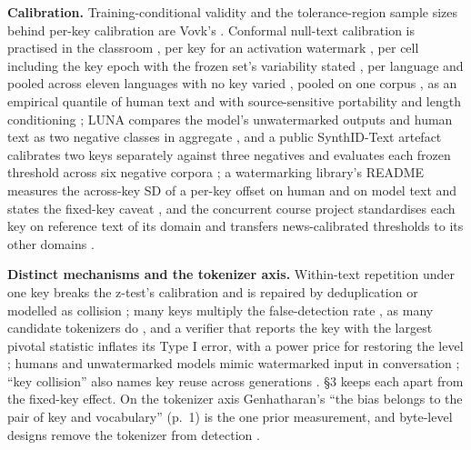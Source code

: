 \documentclass[11pt,letterpaper]{article}
\begin{document}
\textbf{Calibration.} Training-conditional validity and the tolerance-region sample sizes behind per-key calibration are Vovk's \citep[Propositions 2a and 2b]{vovk2012conditional}. Conformal null-text calibration is practised in the classroom \citep{xie2025classroom}, per key for an activation watermark \citep{aremu2026activation}, per cell including the key epoch with the frozen set's variability stated \citep{delbianco2026compliance}, per language and pooled across eleven languages with no key varied \citep{nemecek2026crosslingual}, pooled on one corpus \citep{lichen2026chainmark}, as an empirical quantile of human text \citep{dathathri2024synthid} and with source-sensitive portability and length conditioning \citep{lihe2026saccopula, globalsketch2026}; LUNA compares the model's unwatermarked outputs and human text as two negative classes in aggregate \citep{park2026luna}, and a public SynthID-Text artefact calibrates two keys separately against three negatives and evaluates each frozen threshold across six negative corpora \citep{xlr8harder2026synthid}; a watermarking library's README measures the across-key SD of a per-key offset on human and on model text and states the fixed-key caveat \citep{bonet2026llmwatermark}, and the concurrent course project standardises each key on reference text of its domain and transfers news-calibrated thresholds to its other domains \citep{yukhimchuk2026keylottery}.

\textbf{Distinct mechanisms and the tokenizer axis.} Within-text repetition under one key breaks the z-test's calibration and is repaired by deduplication or modelled as collision \citep{fernandez2023bricks, kirchenbauer2024reliability, cai2025collision}; many keys multiply the false-detection rate \citep{fu2025multiuse}, as many candidate tokenizers do \citep{wang2026bytemark}, and a verifier that reports the key with the largest pivotal statistic inflates its Type I error, with a power price for restoring the level \citep{zhou2026blade}; humans and unwatermarked models mimic watermarked input in conversation \citep{khachaturov2025repetition}; ``key collision'' also names key reuse across generations \citep{wu2024collision}. \S{}3 keeps each apart from the fixed-key effect. On the tokenizer axis Genhatharan's ``the bias belongs to the pair of key and vocabulary'' (p.~1) is the one prior measurement, and byte-level designs remove the tokenizer from detection \citep{li2026tiwm, wang2026bytemark}.
\end{document}
